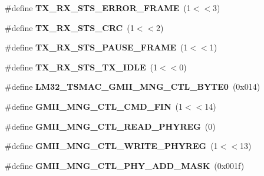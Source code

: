 \begin{DoxyCompactItemize}
\item 
\mbox{\label{group__lm32__tsmac_gac45fa06029924635643cc5ecb7f852a9}} 
\#define {\bfseries T\+X\+\_\+\+R\+X\+\_\+\+S\+T\+S\+\_\+\+E\+R\+R\+O\+R\+\_\+\+F\+R\+A\+ME}~(1$<$$<$3)
\item 
\mbox{\label{group__lm32__tsmac_ga6453863e967997cbcdb4c49fc9cec28b}} 
\#define {\bfseries T\+X\+\_\+\+R\+X\+\_\+\+S\+T\+S\+\_\+\+C\+RC}~(1$<$$<$2)
\item 
\mbox{\label{group__lm32__tsmac_ga275a1f202df068452a6575ef3f5bee16}} 
\#define {\bfseries T\+X\+\_\+\+R\+X\+\_\+\+S\+T\+S\+\_\+\+P\+A\+U\+S\+E\+\_\+\+F\+R\+A\+ME}~(1$<$$<$1)
\item 
\mbox{\label{group__lm32__tsmac_ga9c9c42b66c56ba2324334173601adc8e}} 
\#define {\bfseries T\+X\+\_\+\+R\+X\+\_\+\+S\+T\+S\+\_\+\+T\+X\+\_\+\+I\+D\+LE}~(1$<$$<$0)
\item 
\mbox{\label{group__lm32__tsmac_gad530f41a89fdeed09191d6c13e10c682}} 
\#define {\bfseries L\+M32\+\_\+\+T\+S\+M\+A\+C\+\_\+\+G\+M\+I\+I\+\_\+\+M\+N\+G\+\_\+\+C\+T\+L\+\_\+\+B\+Y\+T\+E0}~(0x014)
\item 
\mbox{\label{group__lm32__tsmac_ga36b843cc145a22a7c29f03603c0b70b8}} 
\#define {\bfseries G\+M\+I\+I\+\_\+\+M\+N\+G\+\_\+\+C\+T\+L\+\_\+\+C\+M\+D\+\_\+\+F\+IN}~(1$<$$<$14)
\item 
\mbox{\label{group__lm32__tsmac_ga859905007f56778c99bcd9b571cb580f}} 
\#define {\bfseries G\+M\+I\+I\+\_\+\+M\+N\+G\+\_\+\+C\+T\+L\+\_\+\+R\+E\+A\+D\+\_\+\+P\+H\+Y\+R\+EG}~(0)
\item 
\mbox{\label{group__lm32__tsmac_gaab5ebc81a9d2fd742252bddf66d7daed}} 
\#define {\bfseries G\+M\+I\+I\+\_\+\+M\+N\+G\+\_\+\+C\+T\+L\+\_\+\+W\+R\+I\+T\+E\+\_\+\+P\+H\+Y\+R\+EG}~(1$<$$<$13)
\item 
\mbox{\label{group__lm32__tsmac_ga171e2f8aec2e680910990afbed8b13b6}} 
\#define {\bfseries G\+M\+I\+I\+\_\+\+M\+N\+G\+\_\+\+C\+T\+L\+\_\+\+P\+H\+Y\+\_\+\+A\+D\+D\+\_\+\+M\+A\+SK}~(0x001f)
\item 

\end{DoxyCompactItemize}
